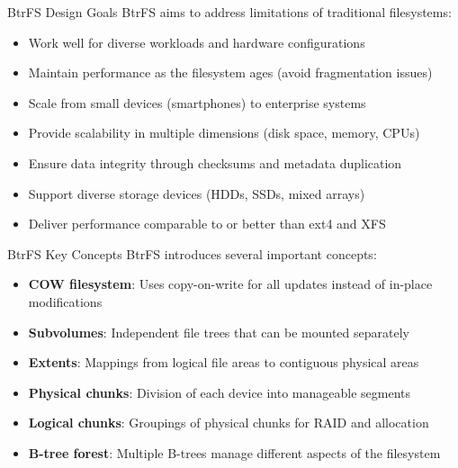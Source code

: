 \begin{definition}{BtrFS Design Goals}
    BtrFS aims to address limitations of traditional filesystems:
    \begin{itemize}
        \item Work well for diverse workloads and hardware configurations
        \item Maintain performance as the filesystem ages (avoid fragmentation issues)
        \item Scale from small devices (smartphones) to enterprise systems
        \item Provide scalability in multiple dimensions (disk space, memory, CPUs)
        \item Ensure data integrity through checksums and metadata duplication
        \item Support diverse storage devices (HDDs, SSDs, mixed arrays)
        \item Deliver performance comparable to or better than ext4 and XFS
    \end{itemize}
\end{definition}

\begin{concept}{BtrFS Key Concepts}
    BtrFS introduces several important concepts:
    \begin{itemize}
        \item \textbf{COW filesystem}: Uses copy-on-write for all updates instead of in-place modifications
        \item \textbf{Subvolumes}: Independent file trees that can be mounted separately
        \item \textbf{Extents}: Mappings from logical file areas to contiguous physical areas
        \item \textbf{Physical chunks}: Division of each device into manageable segments
        \item \textbf{Logical chunks}: Groupings of physical chunks for RAID and allocation
        \item \textbf{B-tree forest}: Multiple B-trees manage different aspects of the filesystem
    \end{itemize}
\end{concept}

